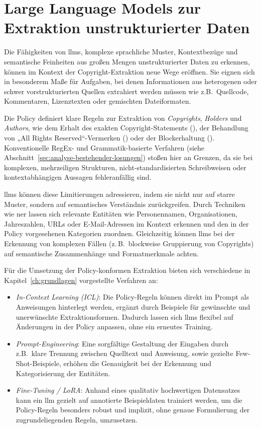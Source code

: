 \section{Large Language Models zur Extraktion unstrukturierter Daten}\label{sec:vorstellung-llm}

Die Fähigkeiten von \glspl{llm}, komplexe sprachliche Muster, Kontextbezüge und semantische Feinheiten aus großen Mengen unstrukturierter Daten zu erkennen, können im Kontext der Copyright-Extraktion neue Wege eröffnen.
Sie eignen sich in besonderem Maße für Aufgaben, bei denen Informationen aus heterogenen oder schwer vorstrukturierten Quellen extrahiert werden müssen wie z.B.\ Quellcode, Kommentaren, Lizenztexten oder gemischten Dateiformaten.

Die Policy definiert klare Regeln zur Extraktion von \textit{Copyrights}, \textit{Holders} und \textit{Authors}, wie dem Erhalt des exakten Copyright-Statements (), der Behandlung von „All Rights Reserved“-Vermerken () oder der Blockerhaltung ().
Konventionelle RegEx- und Grammatik-basierte Verfahren (siehe Abschnitt~\ref{sec:analyse-bestehender-losungen}) stoßen hier an Grenzen, da sie bei komplexen, mehrzeiligen Strukturen, nicht-standardisierten Schreibweisen oder kontextabhängigen Aussagen fehleranfällig sind.

\glspl{llm} können diese Limitierungen adressieren, indem sie nicht nur auf starre Muster, sondern auf semantisches Verständnis zurückgreifen.
Durch Techniken wie \gls{ner} lassen sich relevante Entitäten wie Personennamen, Organisationen, Jahreszahlen, URLs oder E-Mail-Adressen im Kontext erkennen und den in der Policy vorgesehenen Kategorien zuordnen.
Gleichzeitig können \glspl{llm} bei der Erkennung von komplexen Fällen (z.\,B.\ blockweise Gruppierung von Copyrights) auf semantische Zusammenhänge und Formatmerkmale achten.

Für die Umsetzung der Policy-konformen Extraktion bieten sich verschiedene in Kapitel~\ref{ch:grundlagen} vorgestellte Verfahren an:
\begin{itemize}
    \item \textit{In-Context Learning (ICL)}: Die Policy-Regeln können direkt im Prompt als Anweisungen hinterlegt werden, ergänzt durch Beispiele für gewünschte und unerwünschte Extraktionsformen. Dadurch lassen sich \glspl{llm} flexibel auf Änderungen in der Policy anpassen, ohne ein erneutes Training.
    \item \textit{Prompt-Engineering}: Eine sorgfältige Gestaltung der Eingaben durch z.B.\ klare Trennung zwischen Quelltext und Anweisung, sowie gezielte Few-Shot-Beispiele, erhöhen die Genauigkeit bei der Erkennung und Kategorisierung der Entitäten.
    \item \textit{Fine-Tuning / LoRA}: Anhand eines qualitativ hochwertigen Datensatzes kann ein \gls{llm} gezielt auf annotierte Beispieldaten trainiert werden, um die Policy-Regeln besonders robust und implizit, ohne genaue Formulierung der zugrundeliegenden Regeln, umzusetzen.
\end{itemize}

